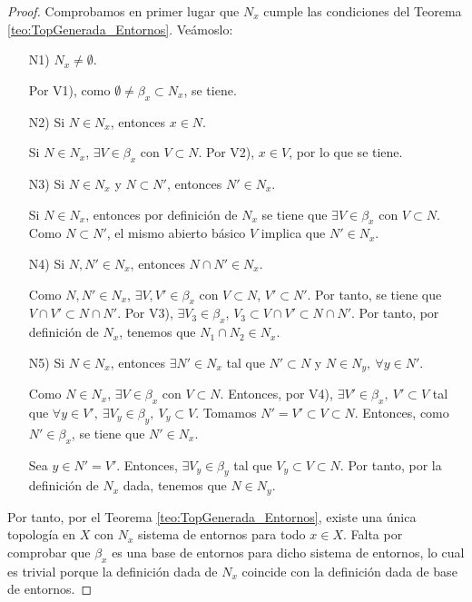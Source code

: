 \begin{proof}
    Comprobamos en primer lugar que $N_x$ cumple las condiciones del Teorema \ref{teo:TopGenerada_Entornos}. Veámoslo:
    \begin{enumerate}
        \item[N1)] $N_x\neq \emptyset$.

        Por V1), como $\emptyset\neq \beta_x\subset N_x$, se tiene.
        
        \item[N2)] Si $N\in N_x$, entonces $x\in N$.

        Si $N\in N_x$, $\exists V\in \beta_x$ con $V\subset N$. Por V2), $x\in V$, por lo que se tiene.
        
        \item[N3)] Si $N\in N_x$ y $N\subset N'$, entonces $N'\in N_x$.

        Si $N\in N_x$, entonces por definición de $N_x$ se tiene que $\exists V\in \beta_x$ con $V\subset N$. Como $N\subset N'$, el mismo abierto básico $V$ implica que $N'\in N_x$.
        
        \item[N4)] Si $N,N'\in N_x$, entonces $N\cap N'\in N_x$.

        Como $N,N'\in N_x$, $\exists V,V'\in \beta_x$ con $V\subset N$, $V'\subset N'$. Por tanto, se tiene que $V\cap V'\subset N\cap N'$. Por V3), $\exists V_3\in \beta_x$, $V_3\subset V\cap V'\subset N\cap N'$. Por tanto, por definición de $N_x$, tenemos que $N_1\cap N_2\in N_x$.
        
        \item[N5)] Si $N\in N_x$, entonces $\exists N'\in N_x$ tal que $N'\subset N$ y $N\in N_y,~\forall y\in N'$.

        Como $N\in N_x$, $\exists V\in \beta_x$ con $V\subset N$. Entonces, por V4), $\exists V'\in \beta_x,~V'\subset V$ tal que $\forall y\in V',~\exists V_y\in \beta_y,~V_y\subset V$. Tomamos $N'=V'\subset V\subset N$. Entonces, como $N'\in \beta_x$, se tiene que $N'\in N_x$. 

        Sea $y\in N'=V'$. Entonces, $\exists V_y\in \beta_y$ tal que $V_y\subset V\subset N$. Por tanto, por la definición de $N_x$ dada, tenemos que $N\in N_y$.
    \end{enumerate}

    Por tanto, por el Teorema \ref{teo:TopGenerada_Entornos}, existe una única topología en $X$ con $N_x$ sistema de entornos para todo $x\in X$. Falta por comprobar que $\beta_x$ es una base de entornos para dicho sistema de entornos, lo cual es trivial porque la definición dada de $N_x$ coincide con la definición dada de base de entornos.
\end{proof}


